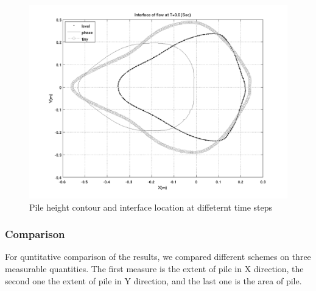 \documentclass[letterpaper,10pt]{article}
\begin{document}
\begin{figure}[H]
\begin{minipage}[b]{.48 \linewidth}
    \includegraphics[width=1\textwidth]{IMAGES/interface60.png}
  \end{minipage}
  \caption{Pile height contour and interface location at diffeternt time steps}
  \label{odinary}
\end{figure}

\subsubsection{Comparison}

For quntitative comparison of the results, we compared different schemes on three measurable quantities. 
The first measure is the extent of pile in X direction, the second one the extent of pile in Y direction, and 
the last one is the area of pile.
\end{document}
